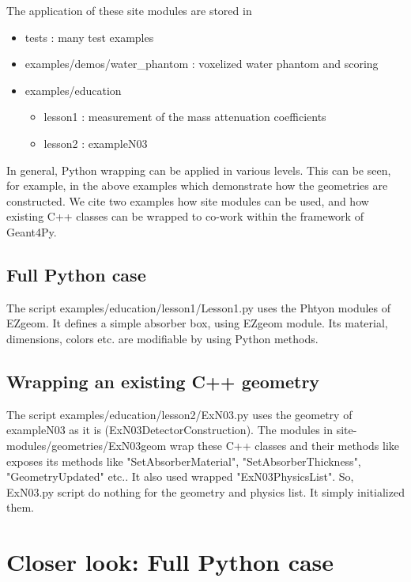 \documentclass{article}
\begin{document}
 The application of these site modules are stored in
  \begin{itemize}
  \item tests : many test examples
  \item examples/demos/water\_phantom : voxelized water phantom and scoring
  \item examples/education
        \begin{itemize}
        \item lesson1 : measurement of the mass attenuation coefficients
        \item lesson2 : exampleN03
        \end{itemize}
  \end{itemize}
 In general, Python wrapping can be applied in various levels.
This can be seen, for example, in the above examples which demonstrate how the 
geometries are constructed. We cite two examples how site modules can be used,
and how existing C++ classes can be wrapped to co-work within the framework of
Geant4Py.

\subsection{Full Python case}
 The script examples/education/lesson1/Lesson1.py uses the Phtyon modules of 
EZgeom. It defines a simple absorber box, using EZgeom module. Its material, 
dimensions, colors etc. are modifiable by using Python methods.

\subsection{Wrapping an existing C++ geometry}
 The script examples/education/lesson2/ExN03.py uses the geometry of
 exampleN03 as it is (ExN03DetectorConstruction).
The modules in site-modules/geometries/ExN03geom wrap these C++ classes and 
their methods like  exposes its methods like "SetAbsorberMaterial", 
"SetAbsorberThickness", "GeometryUpdated" etc..  
It also used wrapped "ExN03PhysicsList".
 So, ExN03.py script do nothing for the geometry and physics list. It simply
initialized them.

\section{Closer look: Full Python case}
\end{document}

